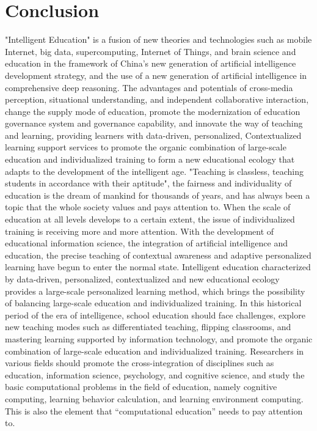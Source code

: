 \documentclass[lang=en,11pt,a4paper,towcolumn]{elegantpaper}
\begin{document}
{\section{Conclusion}
"Intelligent Education" is a fusion of new theories and technologies such as mobile Internet, big data, supercomputing, Internet of Things, and brain science and education in the framework of China's new generation of artificial intelligence development strategy, and the use of a new generation of artificial intelligence in comprehensive deep reasoning. The advantages and potentials of cross-media perception, situational understanding, and independent collaborative interaction, change the supply mode of education, promote the modernization of education governance system and governance capability, and innovate the way of teaching and learning, providing learners with data-driven, personalized, Contextualized learning support services to promote the organic combination of large-scale education and individualized training to form a new educational ecology that adapts to the development of the intelligent age.
"Teaching is classless, teaching students in accordance with their aptitude", the fairness and individuality of education is the dream of mankind for thousands of years, and has always been a topic that the whole society values ​​and pays attention to. When the scale of education at all levels develops to a certain extent, the issue of individualized training is receiving more and more attention. With the development of educational information science, the integration of artificial intelligence and education, the precise teaching of contextual awareness and adaptive personalized learning have begun to enter the normal state. Intelligent education characterized by data-driven, personalized, contextualized and new educational ecology provides a large-scale personalized learning method, which brings the possibility of balancing large-scale education and individualized training. In this historical period of the era of intelligence, school education should face challenges, explore new teaching modes such as differentiated teaching, flipping classrooms, and mastering learning supported by information technology, and promote the organic combination of large-scale education and individualized training. Researchers in various fields should promote the cross-integration of disciplines such as education, information science, psychology, and cognitive science, and study the basic computational problems in the field of education, namely cognitive computing, learning behavior calculation, and learning environment computing. This is also the element that “computational education” needs to pay attention to.
}
\end{document}
